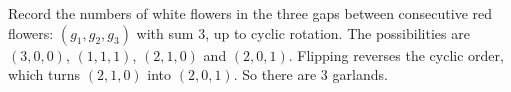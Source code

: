 Record the numbers of white flowers in the three gaps between consecutive red flowers: $(g_1,g_2,g_3)$ with sum $3$, up to cyclic rotation. The possibilities are $(3,0,0)$, $(1,1,1)$, $(2,1,0)$ and $(2,0,1)$. Flipping reverses the cyclic order, which turns $(2,1,0)$ into $(2,0,1)$. So there are $\boxed{3}$ garlands.
